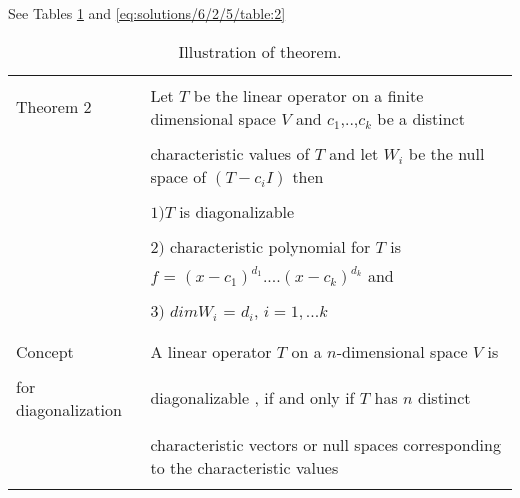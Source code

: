 See Tables \ref{eq:solutions/6/2/5/table:1} and \ref{eq:solutions/6/2/5/table:2}


%
%
\onecolumn
%
\begin{longtable}{|l|l|}
\hline
\multirow{3}{*}{Theorem 2} & \\
& Let $T$ be the linear operator on a finite dimensional space $V$ and $c_1$,..,$c_k$ be a distinct \\
&\\
&characteristic values of $T$ and let $W_i$ be the null space of $(T-c_iI)$ then \\
&\\
& $1)T$ is diagonalizable \\
&\\
& $2)$ characteristic polynomial for $T$ is \\
& $f$ = $(x-c_1)^{d_1}$....$(x-c_k)^{d_k}$ and \\
&\\
& $3)$ $dim W_i$ = $d_i$, $i= 1,...k$\\
&\\
\hline
\multirow{3}{*}{Concept} & \\
&
A linear operator $T$ on a $n$-dimensional space $V$ is\\ 
&\\ for diagonalization
& diagonalizable , if and only if $T$ has $n$ distinct \\
&\\
& characteristic vectors or null spaces corresponding to the characteristic values\\
\hline
\caption{Illustration of theorem.}
\label{eq:solutions/6/2/5/table:1}
\end{longtable}
